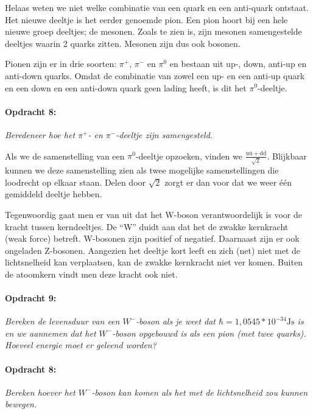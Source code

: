 Helaas weten we niet welke combinatie van een quark en een anti-quark
ontstaat. Het nieuwe deeltje is het eerder genoemde pion. Een pion
hoort bij een hele nieuwe groep deeltjes; de mesonen. Zoals te zien
is, zijn mesonen samengestelde deeltjes waarin 2 quarks zitten. Mesonen
zijn dus ook bosonen.

Pionen zijn er in drie soorten: $\pi^{+}$, $\pi^{-}$ en $\pi^{0}$
en bestaan uit up-, down, anti-up en anti-down quarks. Omdat de combinatie
van zowel een up- en een anti-up quark en een down en een anti-down
quark geen lading heeft, is dit het $\pi^{0}$-deeltje.


\paragraph*{Opdracht 8:}

\emph{Beredeneer hoe het $\pi^{+}$- en $\pi^{-}$-deeltje zijn samengesteld. }

Als we de samenstelling van een $\pi^{0}$-deeltje opzoeken, vinden
we $\frac{\mathrm{u\bar{u}+d\bar{d}}}{\sqrt{2}}$. Blijkbaar kunnen
we deze samenstelling zien als twee mogelijke samenstellingen die
loodrecht op elkaar staan. Delen door $\sqrt{2}$ zorgt er dan voor
dat we weer één gemiddeld deeltje hebben.

Tegenwoordig gaat men er van uit dat het W-boson verantwoordelijk
is voor de kracht tussen kerndeeltjes. De ``W'' duidt aan dat het
de zwakke kernkracht (weak force) betreft. W-bosonen zijn positief
of negatief. Daarnaast zijn er ook ongeladen Z-bosonen. Aangezien
het deeltje kort leeft en zich (net) niet met de lichtsnelheid kan
verplaatsen, kan de zwakke kernkracht niet ver komen. Buiten de atoomkern
vindt men deze kracht ook niet. 


\paragraph*{Opdracht 9:}

\emph{Bereken de levensduur van een $W^{-}$-boson als je weet dat
$\hbar=1,0545*10^{-34}\mathrm{Js}$ is en we aannemen dat het $W^{-}$-boson
opgebouwd is als een pion (met twee quarks). Hoeveel energie moet
er geleend worden?}


\paragraph*{Opdracht 8:}

\emph{Bereken hoever het $W^{-}$-boson kan komen als het met de lichtsnelheid
zou kunnen bewegen.}

